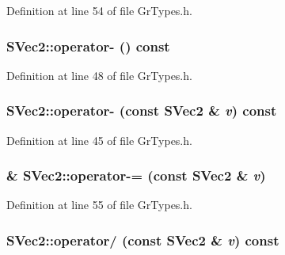 Definition at line 54 of file GrTypes.h.\hypertarget{struct_s_vec2_d089588724b686daaa90f508f8984cbd}{
\subsubsection[{operator-}]{ SVec2::operator- () const}}
\label{struct_s_vec2_d089588724b686daaa90f508f8984cbd}




Definition at line 48 of file GrTypes.h.\hypertarget{struct_s_vec2_97c12ba0c952ce566ebab5b8ba62e2fd}{
\subsubsection[{operator-}]{ SVec2::operator- (const {\bf SVec2} \& {\em v}) const}}
\label{struct_s_vec2_97c12ba0c952ce566ebab5b8ba62e2fd}




Definition at line 45 of file GrTypes.h.\hypertarget{struct_s_vec2_4c97280b8729de306dcba2c166c86906}{
\subsubsection[{operator-=}]{\& SVec2::operator-= (const {\bf SVec2} \& {\em v})}}
\label{struct_s_vec2_4c97280b8729de306dcba2c166c86906}




Definition at line 55 of file GrTypes.h.\hypertarget{struct_s_vec2_5f8b6d2bde6538b5ae7ab0197e8f7c4b}{
\subsubsection[{operator/}]{ SVec2::operator/ (const {\bf SVec2} \& {\em v}) const}}
\label{struct_s_vec2_5f8b6d2bde6538b5ae7ab0197e8f7c4b}




